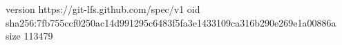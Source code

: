 version https://git-lfs.github.com/spec/v1
oid sha256:7fb755ccf0250ac14d991295c6483f5fa3e1433109ca316b290e269e1a00886a
size 113479
